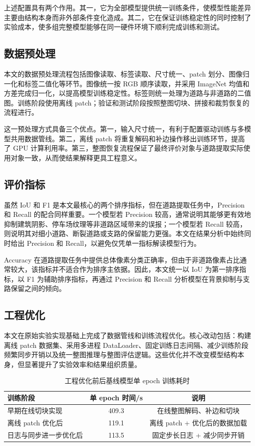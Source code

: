 上述配置具有两个作用。其一，它为全部模型提供统一训练条件，使模型性能差异主要由结构本身而非外部条件变化造成。其二，它在保证训练稳定性的同时控制了实验成本，使多组完整模型能够在同一硬件环境下顺利完成训练和测试。

\subsection{数据预处理}
本文的数据预处理流程包括图像读取、标签读取、尺寸统一、patch 划分、图像归一化和标签二值化等环节。图像统一按 RGB 顺序读取，并采用 ImageNet 均值和方差完成归一化，以提高模型训练稳定性。标签则统一处理为道路与非道路的二值图。训练阶段使用离线 patch；验证和测试阶段按照整图切块、拼接和裁剪恢复的流程进行。

这一预处理方式具备三个优点。第一，输入尺寸统一，有利于配置驱动训练与多模型共用数据管线。第二，离线 patch 将重复解码和补边操作移出训练环节，提高了 GPU 计算利用率。第三，整图恢复流程保证了最终评价对象与道路提取实际使用对象一致，从而使结果解释更具工程意义。

\subsection{评价指标}
虽然 IoU 和 F1 是本文最核心的两个排序指标，但在道路提取任务中，Precision 和 Recall 的配合同样重要。一个模型若 Precision 较高，通常说明其能够更有效地抑制建筑阴影、停车场纹理等非道路区域带来的误报；一个模型若 Recall 较高，则说明其对细小道路、断裂道路或支路的保留能力更强。本文在结果分析中始终同时给出 Precision 和 Recall，以避免仅凭单一指标解读模型行为。

Accuracy 在道路提取任务中提供总体像素分类正确率，但由于非道路像素占比通常较大，该指标并不适合作为排序主依据。因此，本文统一以 IoU 为第一排序指标，以 F1 为辅助排序指标，再通过 Precision 和 Recall 分析模型在背景抑制与支路保留之间的倾向。

\subsection{工程优化}
本文在原始实验实现基础上完成了数据管线和训练流程优化。核心改动包括：构建离线 patch 数据集、采用多进程 DataLoader、固定训练日志间隔、减少训练阶段频繁同步开销以及统一整图推理与整图评估逻辑。这些优化并不改变模型结构本身，但显著提升了实验效率和结果组织质量。

\begin{table}[htbp]
\centering
\caption{工程优化前后基线模型单 epoch 训练耗时}
\label{tab:v2-engineering-speed}
\begin{tabular}{lcc}
\toprule
训练阶段 & 单 epoch 时间/s & 说明 \\
\midrule
早期在线切块实现 & 409.3 & 在线整图解码、补边和切块 \\
离线 patch 优化后 & 119.1 & 离线 patch + 优化后的数据加载 \\
日志与同步进一步优化后 & 113.5 & 固定步长日志 + 减少同步开销 \\
\bottomrule
\end{tabular}
\end{table}

